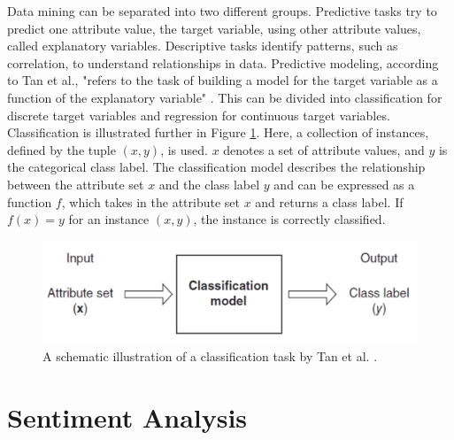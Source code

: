 Data mining can be separated into two different groups. Predictive tasks try to predict one attribute value, the target variable, using other attribute values, called explanatory variables. Descriptive tasks identify patterns, such as correlation, to understand relationships in data. Predictive modeling, according to Tan et al., "refers to the task of building a model for the target variable as a function of the explanatory variable" \cite[p.~29]{DBLP:books/aw/TanSKK2019}. This can be divided into classification for discrete target variables and regression for continuous target variables. Classification is illustrated further in Figure \ref{fig:classifiation}. Here, a collection of instances, defined by the tuple $(x,y)$, is used. $x$ denotes a set of attribute values, and $y$ is the categorical class label. The classification model describes the relationship between the attribute set $x$ and the class label $y$ and can be expressed as a function $f$, which takes in the attribute set $x$ and returns a class label. If $f(x) = y$ for an instance $(x,y)$, the instance is correctly classified.
\begin{figure}
    \centering
    \includegraphics[scale = 0.6]{Images/classification.png}
    \caption{A schematic illustration of a classification task by Tan et al. \cite[p.~134]{DBLP:books/aw/TanSKK2019}.}
    \label{fig:classifiation}
\end{figure}



\section{Sentiment Analysis}

